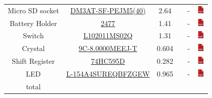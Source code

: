 \documentclass[12pt,a4paper,landscape]{article}
\begin{document}
{\begin{tabular}{|c|c|c|c|c|c|}
					Micro SD socket &
					\href{http://fr.farnell.com/hirose-hrs/dm3at-sf-pejm5-40/connecteur-micro-sd-push-push/dp/1764374}
					{DM3AT-SF-PEJM5(40)} & 2.64 & &
					- &
					\href{http://www.farnell.com/datasheets/1697167.pdf}{\includegraphics[height=1em]{pdf.png}}\\
					    
					Battery Holder &
					\href{http://fr.farnell.com/keystone/2477/battery-holder-pcb/dp/1650684}
					{2477} & 1.41 & &
					- &
					\href{http://www.farnell.com/datasheets/1703957.pdf}{\includegraphics[height=1em]{pdf.png}}\\
					    
					Switch &
					\href{http://fr.farnell.com/c-k-components/l102011ms02q/commutateur-lateral-spdt/dp/2435160}
					{L102011MS02Q} & 1.31 & &
					- &
					\href{http://www.farnell.com/datasheets/1839859.pdf}{\includegraphics[height=1em]{pdf.png}}\\

					Crystal &
					\href{http://fr.farnell.com/txc/9c-8-000meej-t/xtal-8-000mhz-18pf-smd-hc-49s/dp/1842347}
					{9C-8.0000MEEJ-T} & 0.604 & &
					- &
					\href{http://www.farnell.com/datasheets/1497895.pdf}{\includegraphics[height=1em]{pdf.png}}\\
					    
					Shift Register &
					\href{http://fr.farnell.com/nexperia/74hc595d/circuit-logique-74hc-cms/dp/1201269}
					{74HC595D} & 0.282 & &
					- &
					\href{http://www.farnell.com/datasheets/2038613.pdf}{\includegraphics[height=1em]{pdf.png}}\\
					    
					LED &
					\href{http://fr.farnell.com/kingbright/l-154a4sureqbfzgew/led-multicol-rgb-5mm-x-brillant/dp/2290375}
					{L-154A4SUREQBFZGEW} & 0.965 & &
					- &
					\href{http://www.farnell.com/datasheets/2046653.pdf}{\includegraphics[height=1em]{pdf.png}}\\
					    
					\hline
					total & & & & &\\
					\hline
				\end{tabular}
			}
\end{document}
